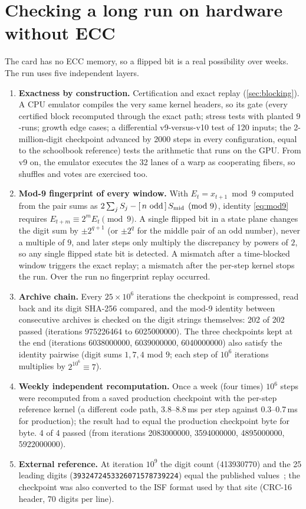 \documentclass[11pt,a4paper]{article}
\newcommand{\code}[1]{\texttt{\small #1}}
\newcommand{\Iverson}[1]{[\,#1\,]}
\theoremstyle{remark}
\begin{document}
\section{Checking a long run on hardware without ECC}\label{sec:verify}

The card has no ECC memory, so a flipped bit is a real possibility over weeks. The run uses five independent layers.
\begin{enumerate}[leftmargin=1.6em]
\item \textbf{Exactness by construction.} Certification and exact replay (\cref{sec:blocking}). A CPU emulator compiles the very same kernel headers, so its gate (every certified block recomputed through the exact path; stress tests with planted $9$-runs; growth edge cases; a differential v9-versus-v10 test of 120 inputs; the 2-million-digit checkpoint advanced by \num{2000} steps in every configuration, equal to the schoolbook reference) tests the arithmetic that runs on the GPU. From v9 on, the emulator executes the 32 lanes of a warp as cooperating fibers, so shuffles and votes are exercised too.
\item \textbf{Mod-9 fingerprint of every window.} With $E_t=x_{t+1}\bmod 9$ computed from the pair sums as $2\sum_jS_j-\Iverson{n\text{ odd}}\,S_{\rm mid}\pmod 9$, identity \eqref{eq:mod9} requires $E_{t+m}\equiv 2^mE_t\pmod 9$. A single flipped bit in a state plane changes the digit sum by $\pm2^{q+1}$ (or $\pm2^q$ for the middle pair of an odd number), never a multiple of $9$, and later steps only multiply the discrepancy by powers of $2$, so any single flipped state bit is detected. A mismatch after a time-blocked window triggers the exact replay; a mismatch after the per-step kernel stops the run. Over the run no fingerprint replay occurred.
\item \textbf{Archive chain.} Every $25\times10^6$ iterations the checkpoint is compressed, read back and its digit SHA-256 compared, and the mod-9 identity between consecutive archives is checked on the digit strings themselves: 202 of 202 passed (iterations \num{975226464} to \num{6025000000}). The three checkpoints kept at the end (iterations \num{6038000000}, \num{6039000000}, \num{6040000000}) also satisfy the identity pairwise (digit sums $1,7,4$ mod $9$; each step of $10^6$ iterations multiplies by $2^{10^6}\equiv7$).
\item \textbf{Weekly independent recomputation.} Once a week (four times) $10^6$ steps were recomputed from a saved production checkpoint with the per-step reference kernel (a different code path, 3.8--8.8\,ms per step against 0.3--0.7\,ms for production); the result had to equal the production checkpoint byte for byte. 4 of 4 passed (from iterations \num{2083000000}, \num{3594000000}, \num{4895000000}, \num{5922000000}).
\item \textbf{External reference.} At iteration $10^9$ the digit count (\num{413930770}) and the 25 leading digits (\code{3932472453326071578739224}) equal the published values~\cite{p196org}; the checkpoint was also converted to the ISF format used by that site (CRC-16 header, 70 digits per line).
\end{enumerate}
\end{document}
